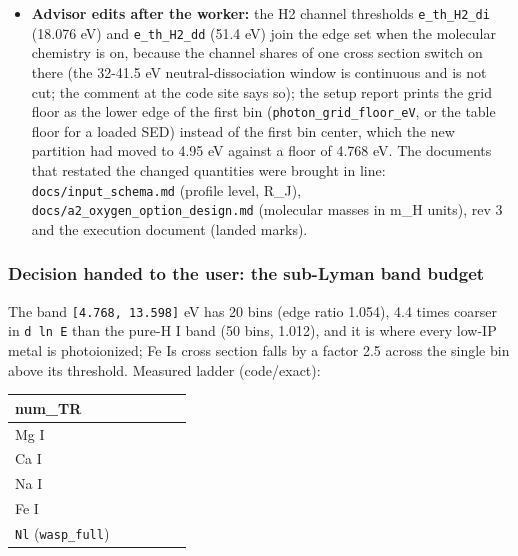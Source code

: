 \documentclass[english,a4paper]{my_memo}
\begin{document}
\begin{itemize}
  unchanged. \texttt{mol\_base\_handoff}: 1e-4 class, by the H2 edge alone. Open
  (decision needed, below): Mg I, Ca I, Na I, Fe I still miss 1e-3 by 0.25
  to 0.58 percent, the rectangle-rule error of the 20-bin sub-Lyman band.
\item
  \textbf{Advisor edits after the worker:} the H2 channel thresholds
  \texttt{e\_th\_H2\_di} (18.076 eV) and \texttt{e\_th\_H2\_dd} (51.4 eV) join the edge set when
  the molecular chemistry is on, because the channel shares of one cross
  section switch on there (the 32-41.5 eV neutral-dissociation window is
  continuous and is not cut; the comment at the code site says so); the setup
  report prints the grid floor as the lower edge of the first bin
  (\texttt{photon\_grid\_floor\_eV}, or the table floor for a loaded SED) instead of
  the first bin center, which the new partition had moved to 4.95 eV
  against a floor of 4.768 eV. The documents that restated the changed
  quantities were brought in line: \texttt{docs/input\_schema.md} (profile level,
  R\_J), \texttt{docs/a2\_oxygen\_option\_design.md} (molecular masses in m\_H units),
  rev 3 and the execution document (landed marks).
\end{itemize}

\subsubsection{Decision handed to the user: the sub-Lyman band budget}\label{decision-handed-to-the-user-the-sub-lyman-band-budget}

The band \texttt{{[}4.768,\ 13.598{]}} eV has 20 bins (edge ratio 1.054), 4.4 times
coarser in \texttt{d\ ln\ E} than the pure-H I band (50 bins, 1.012), and it is where
every low-IP metal is photoionized; Fe I\textquotesingle s cross section falls by a factor
2.5 across the single bin above its threshold. Measured ladder (code/exact):

{\def\LTcaptype{none} %
{\small
\begin{longtable}[]{@{}>{\raggedright\arraybackslash}p{\dimexpr(\linewidth-12\tabcolsep)/6\relax}>{\raggedright\arraybackslash}p{\dimexpr(\linewidth-12\tabcolsep)/6\relax}>{\raggedright\arraybackslash}p{\dimexpr(\linewidth-12\tabcolsep)/6\relax}>{\raggedright\arraybackslash}p{\dimexpr(\linewidth-12\tabcolsep)/6\relax}>{\raggedright\arraybackslash}p{\dimexpr(\linewidth-12\tabcolsep)/6\relax}>{\raggedright\arraybackslash}p{\dimexpr(\linewidth-12\tabcolsep)/6\relax}@{}}
\toprule\noalign{}
num\_TR & 20 & 30 & 40 & 50 & 80 \\
\midrule\noalign{}
\endhead
\bottomrule\noalign{}
\endlastfoot
Mg I & 0.99753 & 0.99871 & 0.99915 & 0.99955 & 0.99982 \\
Ca I & 0.99737 & 0.99877 & 0.99937 & 0.99961 & 0.99984 \\
Na I & 0.99752 & 0.99912 & 0.99958 & 0.99967 & 0.99987 \\
Fe I & 0.99417 & 0.99685 & 0.99805 & 0.99883 & 0.99953 \\
\texttt{Nl} (\texttt{wasp\_full}) & 240 & 250 & 260 & 270 & 300 \\
\end{longtable}
}
}
\end{document}
